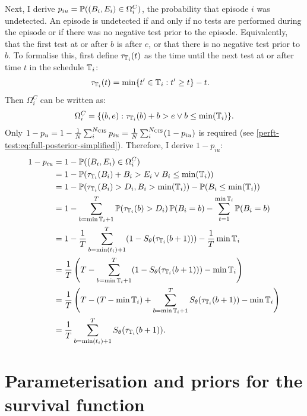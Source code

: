 \documentclass[thesis.tex]{subfiles}
\begin{document}
Next, I derive $p_{iu} = \operatorname{\mathbb{P}}((B_i, E_i) \in \Omega^C_i)$, the probability that episode $i$ was undetected.
An episode is undetected if and only if no tests are performed during the episode or if there was no negative test prior to the episode.
Equivalently, that the first test at or after $b$ is after $e$, or that there is no negative test prior to $b$.
To formalise this, first define $\tau_{\mathbb{T}_i}(t)$ as the time until the next test at or after time $t$ in the schedule $\mathbb{T}_i$:
\begin{align}
\tau_{\mathbb{T}_i}(t) &= \min \{ t' \in \mathbb{T}_i : t' \geq t \} - t.
\end{align}
Then $\Omega^C_i$ can be written as:
\begin{align}
\Omega_i^C = \{ (b, e) : \tau_{\mathbb{T}_i}(b) + b > e \vee b \leq \min(\mathbb{T}_i) \}.
\end{align}
Only $1 - p_u = 1 - \frac{1}{N} \sum_i^{N_\text{CIS}} p_{iu} = \frac{1}{N} \sum_i^{N_\text{CIS}} (1 - p_{iu})$ is required (see \cref{perft-test:eq:full-posterior-simplified}).
Therefore, I derive $1 - p_{iu}$:
\begin{align}
1 - p_{iu}
&= 1 - \operatorname{\mathbb{P}}((B_i, E_i) \in \Omega^C_i) \\
&= 1 - \operatorname{\mathbb{P}}( \tau_{\mathbb{T}_i}(B_i) + B_i > E_i \vee B_i \leq \min(\mathbb{T}_i) ) \\
&= 1 - \operatorname{\mathbb{P}}( \tau_{\mathbb{T}_i}(B_i) > D_i , B_i > \min(\mathbb{T}_i) )  - \operatorname{\mathbb{P}}( B_i \leq \min(\mathbb{T}_i) ) \\
&= 1 - \sum_{b={\min\mathbb{T}_i} + 1}^T \operatorname{\mathbb{P}}( \tau_{\mathbb{T}_i}(b) > D_i) \operatorname{\mathbb{P}}(B_i = b) - \sum_{t=1}^{\min\mathbb{T}_i} \operatorname{\mathbb{P}}(B_i = b)\\
&= 1 - \frac{1}{T} \sum_{b=\min(t_i)+1}^T (1 - S_\theta(\tau_{\mathbb{T}_i}(b + 1))) - \frac{1}{T} \min\mathbb{T}_i \\
&= \frac{1}{T} \left(T - \sum_{b=\min\mathbb{T}_i+1}^T (1 - S_\theta(\tau_{\mathbb{T}_i}(b + 1))) - \min\mathbb{T}_i \right) \\
&= \frac{1}{T} \left(T - (T - \min\mathbb{T}_i) + \sum_{b=\min\mathbb{T}_i+1}^T S_\theta(\tau_{\mathbb{T}_i}(b + 1)) - \min\mathbb{T}_i \right) \\
&= \frac{1}{T} \sum_{b=\min(t_i)+1}^T S_\theta(\tau_{\mathbb{T}_i}(b + 1)).
\end{align}


\section{Parameterisation and priors for the survival function} \label{perf-test:sec:parameters-priors}
\end{document}
